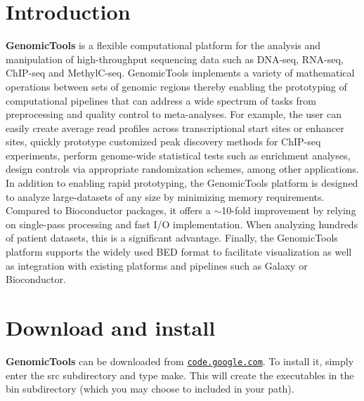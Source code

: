 \hypertarget{index_intro}{}\section{Introduction}\label{index_intro}
{\bf GenomicTools} is a flexible computational platform for the analysis and manipulation of high-throughput sequencing data such as DNA-seq, RNA-seq, ChIP-seq and MethylC-seq. GenomicTools implements a variety of mathematical operations between sets of genomic regions thereby enabling the prototyping of computational pipelines that can address a wide spectrum of tasks from preprocessing and quality control to meta-analyses. For example, the user can easily create average read profiles across transcriptional start sites or enhancer sites, quickly prototype customized peak discovery methods for ChIP-seq experiments, perform genome-wide statistical tests such as enrichment analyses, design controls via appropriate randomization schemes, among other applications. In addition to enabling rapid prototyping, the GenomicTools platform is designed to analyze large-datasets of any size by minimizing memory requirements. Compared to Bioconductor packages, it offers a $\sim$10-fold improvement by relying on single-pass processing and fast I/O implementation. When analyzing hundreds of patient datasets, this is a significant advantage. Finally, the GenomicTools platform supports the widely used BED format to facilitate visualization as well as integration with existing platforms and pipelines such as Galaxy or Bioconductor.\hypertarget{index_download}{}\section{Download and install}\label{index_download}
{\bf GenomicTools} can be downloaded from \href{http://http://code.google.com/p/ibm-cbc-genomic-tools/}{\tt code.google.com}. To install it, simply enter the src subdirectory and type make. This will create the executables in the bin subdirectory (which you may choose to included in your path). 